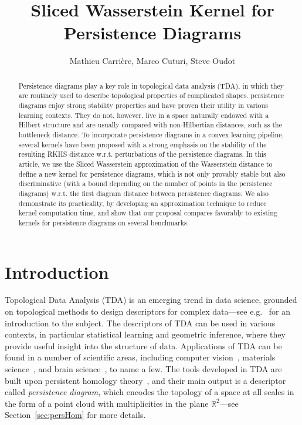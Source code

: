 \documentclass[11pt]{article}
\title{Sliced Wasserstein Kernel for Persistence Diagrams}
\author{Mathieu Carri\`ere, Marco Cuturi, Steve Oudot}
\date{}
\newcommand{\R}{\mathbb{R}}
\begin{document}
\maketitle

\begin{abstract}
Persistence diagrams play a key role in topological data
analysis (TDA), in which they are routinely used to describe
 topological properties of complicated shapes. persistence diagrams
enjoy strong stability properties and have proven their utility in
various learning contexts.  They do not, however, live in a space
naturally endowed with a Hilbert structure and are usually compared
with non-Hilbertian distances, such as the bottleneck distance. To
incorporate persistence diagrams in a convex learning pipeline, several kernels have been
proposed with a strong emphasis on the stability of the resulting RKHS
distance w.r.t. perturbations of the persistence diagrams.  In this article, we use the
Sliced Wasserstein approximation of the Wasserstein distance to
define a new kernel for persistence diagrams, which is not only provably stable but
also discriminative (with a bound depending on the number of points in the persistence diagrams) 
w.r.t. the first diagram distance between persistence diagrams. 
We also demonstrate its practicality, by
developing an approximation technique to reduce kernel computation
time, and show that our proposal compares favorably to existing
kernels for persistence diagrams on several benchmarks.
\end{abstract}

\section{Introduction}

Topological Data Analysis (TDA) is an emerging trend in data
science, grounded on topological methods to design descriptors
for complex data---see e.g.~\cite{Carlsson09b} for an introduction to
the subject.  The descriptors of TDA can be used in various contexts,
in particular statistical learning and geometric inference, where they
provide useful insight into the structure of data.  Applications
of TDA can be found in a number of scientific areas, including
computer vision~\cite{Li14}, materials science~\cite{Hiraoka16}, and
brain science~\cite{Singh08}, to name a few.  The tools developed in
TDA are built upon persistent homology
theory~\cite{Edelsbrunner10,Oudot15}, and their main output is a
descriptor called {\em persistence diagram}, which encodes the
topology of a space at all scales in the form of a point cloud with
multiplicities in the plane $\R^2$---see Section~\ref{sec:persHom} for more details.
\end{document}
